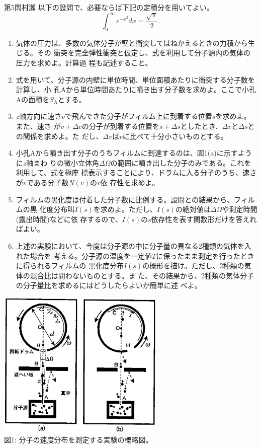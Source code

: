 \begin{question}{第5問}{村瀬}
以下の設問で、必要ならば下記の定積分を用いてよい。
\[
  \int_0^\infty e^{-x^2} dx = \frac{\sqrt{\pi}}2.
\]
\begin{enumerate}
\item
  気体の圧力は、多数の気体分子が壁と衝突してはねかえるときの力積から生じる。その
  衝突を完全弾性衝突と仮定し、式を利用して分子源内の気体の圧力を求めよ。計算過
  程も記述すること。
\item
  式を用いて、分子源の内壁に単位時間、単位面積あたりに衝突する分子数を計算し、小
  孔Aから単位時間あたりに噴き出す分子数を求めよ。ここで小孔Aの面積を$S_\mathrm{A}$とする。
\item{}
  $z$軸方向に速さ$v$で飛んできた分子がフィルム上に到着する位置$s$を求めよ。また、速さ
  が$v+\Delta v$の分子が到着する位置を$s+\Delta s$としたとき、$\Delta v$と$\Delta s$との関係を求めよ。た
  だし、$\Delta v$は$v$に比べて十分小さいものとする。
\item{}
  小孔Aから噴き出す分子のうちフィルムに到達するのは、図1(a)に示すように$z$軸まわ
  りの微小立体角$\Delta\Omega$の範囲に噴き出した分子のみである。これを利用して、式を極座
  標表示することにより、ドラムに入る分子のうち、速さが$v$である分子数$N(v)$の$v$依
  存性を求めよ。
\item
  フィルムの黒化度は付着した分子数に比例する。設問との結果から、フィルムの黒
  化度分布叫$I(s)$を求めよ。ただし、$I(s)$の絶対値は$\Delta\Omega$や測定時間(露出時間)などに依
  存するので、$I(s)$の$s$依存性を表す関数形だけを答えればよい。
\item
  上述の実験において、今度は分子源の中に分子量の異なる2種類の気体を入れた場合を
  考える。分子源の温度を一定値$T$に保ったまま測定を行ったときに得られるフィルムの
  黒化度分布$I(s)$の概形を描け。ただし、2種類の気体の混合比は問わないものとする。ま
  た、その結果から、2種類の気体分子の分子量比を求めるにはどうしたらよいか簡単に述
  べよ。
\end{enumerate}
\begin{center}
  \includegraphics[width=0.6\textwidth]{2007physQ5_1r.eps}\\図1: 分子の速度分布を測定する実験の概略図。

\end{center}
\end{question}
